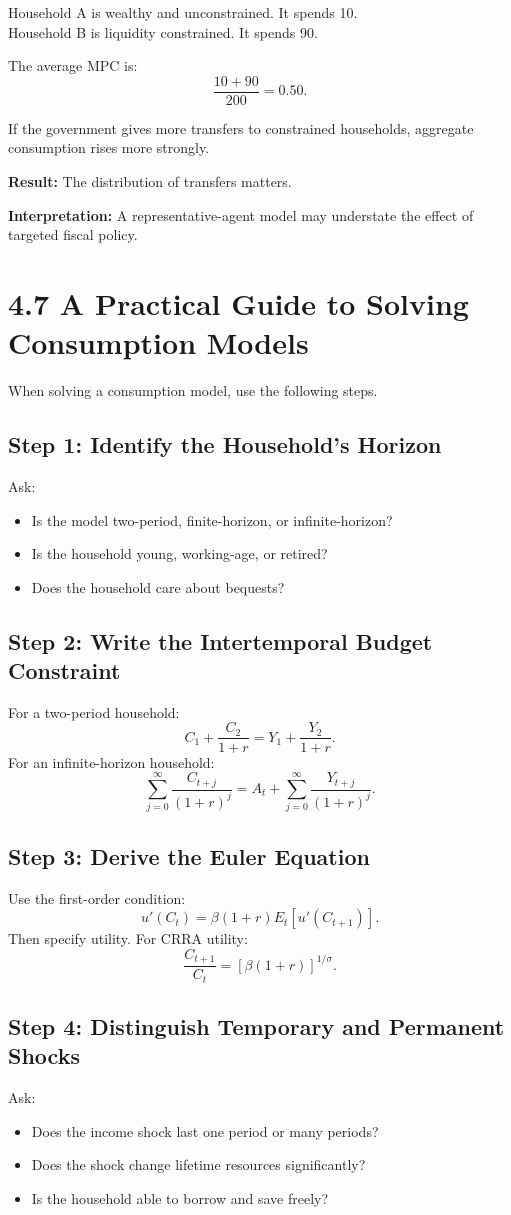 \documentclass[12pt,a4paper]{article}
\begin{document}
Household A is wealthy and unconstrained. It spends 10. \\
Household B is liquidity constrained. It spends 90.

The average MPC is:
\[ \frac{10 + 90}{200} = 0.50. \]

If the government gives more transfers to constrained households, aggregate consumption rises more strongly.

\textbf{Result:} The distribution of transfers matters.

\textbf{Interpretation:} A representative-agent model may understate the effect of targeted fiscal policy.

\section*{4.7 A Practical Guide to Solving Consumption Models}
When solving a consumption model, use the following steps.

\subsection*{Step 1: Identify the Household's Horizon}
Ask:
\begin{itemize}
    \item Is the model two-period, finite-horizon, or infinite-horizon?
    \item Is the household young, working-age, or retired?
    \item Does the household care about bequests?
\end{itemize}

\subsection*{Step 2: Write the Intertemporal Budget Constraint}
For a two-period household:
\[ C_1 + \frac{C_2}{1+r} = Y_1 + \frac{Y_2}{1+r}. \]
For an infinite-horizon household:
\[ \sum_{j=0}^{\infty} \frac{C_{t+j}}{(1+r)^j} = A_t + \sum_{j=0}^{\infty} \frac{Y_{t+j}}{(1+r)^j}. \]

\subsection*{Step 3: Derive the Euler Equation}
Use the first-order condition:
\[ u'(C_t) = \beta(1+r)E_t[u'(C_{t+1})]. \]
Then specify utility. For CRRA utility:
\[ \frac{C_{t+1}}{C_t} = [\beta(1+r)]^{1/\sigma}. \]

\subsection*{Step 4: Distinguish Temporary and Permanent Shocks}
Ask:
\begin{itemize}
    \item Does the income shock last one period or many periods?
    \item Does the shock change lifetime resources significantly?
    \item Is the household able to borrow and save freely?
\end{itemize}
\end{document}
